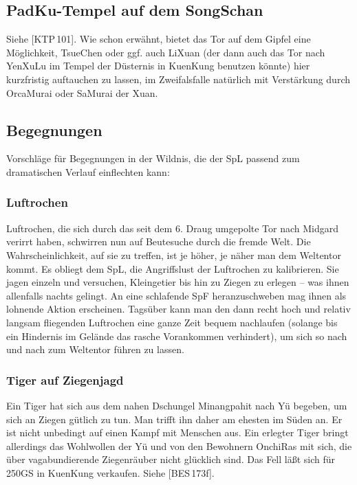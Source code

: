 \documentclass[
a4paper,
twoside,
DIV=calc,
BCOR=4mm,
fontsize=9pt,
twocolumn=on,
titlepage=on,
parskip=half
]{scrartcl}
\begin{document}
\subsection{PadKu-Tempel auf dem SongSchan}

Siehe [KTP\,101]. Wie schon erwähnt, bietet das Tor auf dem Gipfel
eine Möglichkeit, TsueChen oder ggf. auch LiXuan (der dann auch das
Tor nach YenXuLu im Tempel der Düsternis in KuenKung benutzen könnte)
hier kurzfristig auftauchen zu lassen, im Zweifalsfalle natürlich mit
Verstärkung durch OrcaMurai oder SaMurai der Xuan.

\subsection{Begegnungen}

Vorschläge für Begegnungen in der Wildnis, die der SpL passend zum
dramatischen Verlauf einflechten kann:

\subsubsection{Luftrochen}
\label{begegnung-luftrochen}

Luftrochen, die sich durch das seit dem 6. Draug umgepolte Tor nach
Midgard verirrt haben, schwirren nun auf Beutesuche durch die fremde
Welt. Die Wahrscheinlichkeit, auf sie zu treffen, ist je höher, je
näher man dem Weltentor kommt. Es obliegt dem SpL, die Angriffslust
der Luftrochen zu kalibrieren. Sie jagen einzeln und versuchen,
Kleingetier bis hin zu Ziegen zu erlegen -- was ihnen allenfalls
nachts gelingt. An eine schlafende SpF heranzuschweben mag ihnen als
lohnende Aktion erscheinen. Tagsüber kann man den dann recht hoch und
relativ langsam fliegenden Luftrochen eine ganze Zeit bequem
nachlaufen (solange bis ein Hindernis im Gelände das rasche
Vorankommen verhindert), um sich so nach und nach zum Weltentor führen
zu lassen.

\subsubsection{Tiger auf Ziegenjagd}

Ein Tiger hat sich aus dem nahen Dschungel Minangpahit nach Yü
begeben, um sich an Ziegen gütlich zu tun. Man trifft ihn daher am
ehesten im Süden an. Er ist nicht unbedingt auf einen Kampf mit
Menschen aus. Ein erlegter Tiger bringt allerdings das Wohlwollen der
Yü und von den Bewohnern OnchiRas mit sich, die über vagabundierende
Ziegenräuber nicht glücklich sind. Das Fell läßt sich für 250GS in
KuenKung verkaufen. Siehe [BES\,173f].
\end{document}
